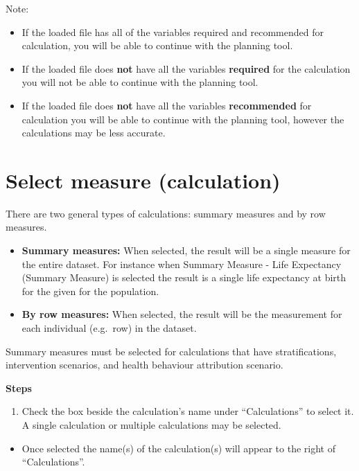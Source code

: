 \documentclass[]{book}
\providecommand{\tightlist}{%
  \setlength{\itemsep}{0pt}\setlength{\parskip}{0pt}}
\begin{document}
Note:

\begin{itemize}
\item
  If the loaded file has all of the variables required and recommended
  for calculation, you will be able to continue with the planning tool.
\item
  If the loaded file does \textbf{not} have all the variables
  \textbf{required} for the calculation you will not be able to continue
  with the planning tool.
\item
  If the loaded file does \textbf{not} have all the variables
  \textbf{recommended} for calculation you will be able to continue with
  the planning tool, however the calculations may be less accurate.
\end{itemize}

\section{Select measure (calculation)}\label{select-measure-calculation}

There are two general types of calculations: summary measures and by row
measures.

\begin{itemize}
\item
  \textbf{Summary measures:} When selected, the result will be a single measure for
the entire dataset. For instance when Summary Measure - Life Expectancy
(Summary Measure) is selected the result is a single life expectancy at
birth for the given for the population.
\item
  \textbf{By row measures:} When selected, the result will be the measurement for
each individual (e.g.~row) in the dataset.
\end{itemize}

Summary measures must be selected for calculations that have
stratifications, intervention scenarios, and health behaviour
attribution scenario.

\textbf{Steps}

\begin{enumerate}
\def\labelenumi{\arabic{enumi}.}
\tightlist
\item
  Check the box beside the calculation's name under ``Calculations'' to
  select it. A single calculation or multiple calculations may be
  selected.
\end{enumerate}

\begin{itemize}
\tightlist
\item
  Once selected the name(s) of the calculation(s) will appear to the
  right of ``Calculations''.
\end{itemize}
\end{document}
